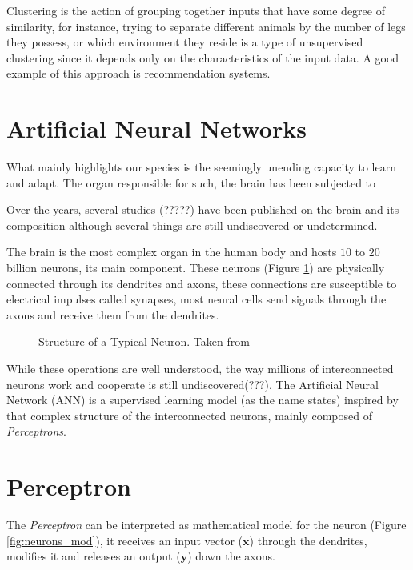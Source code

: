 Clustering is the action of grouping together inputs that have some degree of similarity, for instance, trying to separate different animals by the number of legs they possess, or which environment they reside is a type of unsupervised clustering since it depends only on the characteristics of the input data. A good example of this approach is recommendation systems.


\section{Artificial Neural Networks} \label{sec:ann}

What mainly highlights our species is the seemingly unending capacity to learn and adapt. The organ responsible for such, the brain has been subjected to 

Over the years, several studies (?????) have been published on the brain and its composition although several things are still undiscovered or undetermined.

The brain is the most complex organ in the human body and hosts $10$ to $20$ billion neurons, its main component. These neurons (Figure \ref{fig:neurons}) are physically connected through its dendrites and axons, these connections are susceptible to electrical impulses called synapses, most neural cells send signals through the axons and receive them from the dendrites.

\begin{figure}[H]
	\centering
    \def\svgwidth{0.6\columnwidth}
	
	\caption{Structure of a Typical Neuron. Taken from \cite{wikimediacommonsNeuron2006}}
	\label{fig:neurons}
\end{figure}


While these operations are well understood, the way millions of interconnected neurons work and cooperate is still undiscovered(???). The Artificial Neural Network (ANN) is a supervised learning model (as the name states) inspired by that complex structure of the interconnected neurons, mainly composed of \textit{Perceptrons}.

\section{Perceptron} \label{sec:perceptron}

The \textit{Perceptron} can be interpreted as mathematical model for the neuron (Figure \ref{fig:neurons_mod}), it receives an input vector ($\textbf{x}$) through the dendrites, modifies it and releases an output ($\textbf{y}$) down the axons. 


